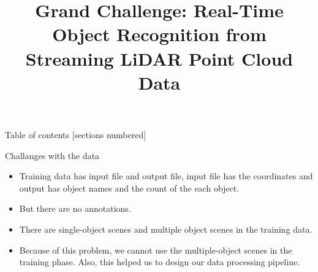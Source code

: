 \documentclass[9pt]{beamer}
\title[Real-Time Object Recognition from Streaming LiDAR Point Cloud Data]{Grand Challenge: Real-Time Object Recognition 
from Streaming LiDAR Point Cloud Data}
\begin{document}







\maketitle






\begin{frame}{Table of contents}
 [sections numbered]
   \tableofcontents[hideallsubsections]


\end{frame}




\begin{frame}[fragile]{Challanges with the data}
	\begin{itemize}
		\item Training data has input file and output file, input file has the coordinates and output has object names and the count of the each object.
		\item But there are no annotations.
		\item There are single-object scenes and multiple object scenes in the training data.
		\item Because of this problem, we cannot use the multiple-object scenes in the training phase. Also, this helped us to design our data processing pipeline.
	\end{itemize}
\end{frame}
\end{document}
